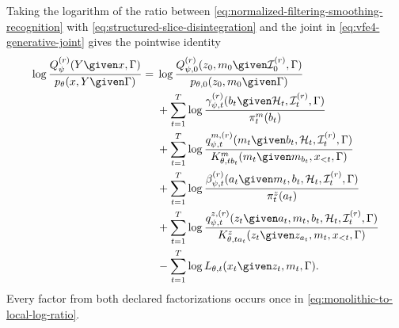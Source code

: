 Taking the logarithm of the ratio between \cref{eq:normalized-filtering-smoothing-recognition} with \cref{eq:structured-slice-disintegration} and the joint in \cref{eq:vfe4-generative-joint} gives the pointwise identity
\begin{equation}
\begin{aligned}
\log\frac{Q_\psi^{(r)}(Y\given x,\Gamma)}
{p_\theta(x,Y\given\Gamma)}
={}&
\log\frac{Q_{\psi,0}^{(r)}
(z_0,m_0\given\mathcal I_0^{(r)},\Gamma)}
{p_{\theta,0}(z_0,m_0\given\Gamma)}\\
&+\sum_{t=1}^{T}
\log\frac{\gamma_{\psi,t}^{(r)}
(b_t\given\mathcal H_t,\mathcal I_t^{(r)},\Gamma)}
{\pi_t^m(b_t)}\\
&+\sum_{t=1}^{T}
\log\frac{q_{\psi,t}^{m,(r)}
(m_t\given b_t,\mathcal H_t,\mathcal I_t^{(r)},\Gamma)}
{K^m_{\theta,tb_t}
(m_t\given m_{b_t},x_{<t},\Gamma)}\\
&+\sum_{t=1}^{T}
\log\frac{\beta_{\psi,t}^{(r)}
(a_t\given m_t,b_t,\mathcal H_t,
\mathcal I_t^{(r)},\Gamma)}
{\pi_t^z(a_t)}\\
&+\sum_{t=1}^{T}
\log\frac{q_{\psi,t}^{z,(r)}
(z_t\given a_t,m_t,b_t,\mathcal H_t,
\mathcal I_t^{(r)},\Gamma)}
{K^z_{\theta,ta_t}
(z_t\given z_{a_t},m_t,x_{<t},\Gamma)}\\
&-\sum_{t=1}^{T}
\log L_{\theta,t}(x_t\given z_t,m_t,\Gamma).
\end{aligned}
\label{eq:monolithic-to-local-log-ratio}
\end{equation}
Every factor from both declared factorizations occurs once in \cref{eq:monolithic-to-local-log-ratio}.

